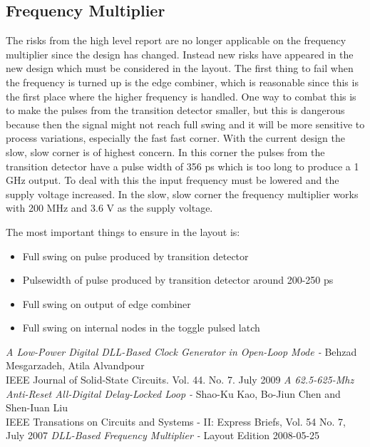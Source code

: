 \documentclass[a4paper,12pt]{article} \usepackage{graphicx}
\begin{document}
\subsection{Frequency Multiplier}
The risks from the high level report are no longer applicable on the frequency
multiplier since the design has changed. Instead new risks have appeared in the
new design which must be considered in the layout. The first thing to fail when
the frequency is turned up is the edge combiner, which is reasonable since this
is the first place where the higher frequency is handled. One way to combat this
is to make the pulses from the transition detector smaller, but this is
dangerous because then the signal might not reach full swing and it will be more
sensitive to process variations, especially the fast fast corner. With the
current design the slow, slow corner is of highest concern. In this corner the
pulses from the transition detector have a pulse width of 356 ps which is too
long to produce a 1 GHz output. To deal with this the input frequency must be
lowered and the supply voltage increased. In the slow, slow corner the frequency
multiplier works with 200 MHz and 3.6 V as the supply voltage.

The most important things to ensure in the layout is:
\begin{itemize}
        \item Full swing on pulse produced by transition detector
        \item Pulsewidth of pulse produced by transition detector around 200-250 ps
        \item Full swing on output of edge combiner
        \item Full swing on internal nodes in the toggle pulsed latch
\end{itemize}

\newpage 
\appendix 
\newpage

\begin{thebibliography}{99}
        \textit{A Low-Power Digital DLL-Based Clock Generator in Open-Loop Mode - }
                Behzad Mesgarzadeh, Atila Alvandpour \\
                IEEE Journal of Solid-State Circuits. Vol. 44. No. 7. July 2009
        \textit{A 62.5-625-Mhz Anti-Reset All-Digital Delay-Locked Loop - }
                Shao-Ku Kao, Bo-Jiun Chen and Shen-Iuan Liu \\
                IEEE Transations on Circuits and Systems - II: Express Briefs, Vol. 54 No. 7, July 2007
        \textit{DLL-Based Frequency Multiplier - }
                Layout Edition 2008-05-25 

\end{thebibliography}
\end{document}
